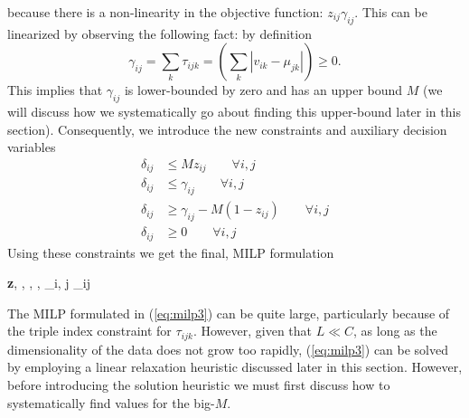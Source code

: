 \documentclass[../thesis.tex]{subfiles}
\begin{document}
because there is a non-linearity in the objective function: $z_{ij}
\gamma_{ij}$. This can be linearized by observing the following fact: by
definition
\begin{equation*}
    \gamma_{ij} = \sum_k \tau_{ijk} = \left(\sum_k |v_{ik} - \mu_{jk}|\right) \geq 0.
\end{equation*}
This implies that $\gamma_{ij}$ is lower-bounded by zero and has an upper bound
$M$ (we will discuss how we systematically go about finding this upper-bound
later in this section). Consequently, we introduce the new constraints and
auxiliary decision variables
\begin{align}
    \delta_{ij} &\leq Mz_{ij} \quad \quad \forall i, j \\
    \delta_{ij} &\leq \gamma_{ij} \quad \quad \forall i,j \\
    \delta_{ij} &\geq \gamma_{ij} - M(1-z_{ij}) \quad \quad \forall i, j \\
    \delta_{ij} &\geq 0 \quad \quad \forall i, j
\end{align}
Using these constraints we get the final, MILP formulation
\begin{mini!}
	{\textbf{z}, \boldsymbol{\mu}, \boldsymbol{\tau}, \boldsymbol{\gamma}, \boldsymbol{\delta}}{\sum_{i, j} \delta_{ij}}
	{\label{eq:milp3}}{}
\end{mini!}
The MILP formulated in (\ref{eq:milp3}) can be quite large, particularly because
of the triple index constraint for $\tau_{ijk}$. However, given that $L \ll C$,
as long as the dimensionality of the data does not grow too rapidly,
(\ref{eq:milp3}) can be solved by employing a linear relaxation heuristic
discussed later in this section. However, before introducing the solution
heuristic we must first discuss how to systematically find values for the
big-$M$.
\end{document}
